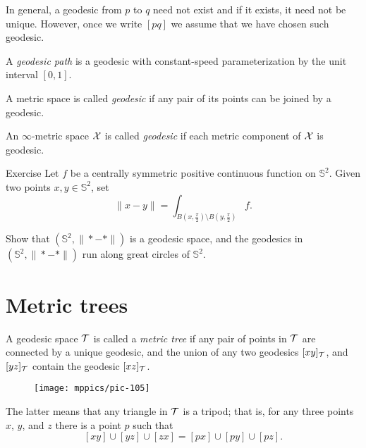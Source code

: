 In general, a geodesic from $p$ to $q$ need not exist and if it exists, it need not  be unique.  
However, once we write $[p q]$ we assume that we have chosen such geodesic.

A \emph{geodesic path} is a geodesic with constant-speed parameterization by the unit interval $[0,1]$.

A metric space is called \emph{geodesic} if any pair of its points can be joined by a geodesic.

An $\infty$-metric space $\mathcal{X}$ is called {}\emph{geodesic} if each metric component of $\mathcal{X}$ is geodesic.

\begin{thm}{Exercise}\label{ex:pogorelov}
Let $f$ be a centrally symmetric positive continuous function on $\mathbb{S}^2$.
Given two points $x,y\in \mathbb{S}^2$,
set 
\[\|x-y\|=\int_{B(x,\frac \pi2)\setminus B(y,\frac\pi2)}f.\]

Show that $(\mathbb{S}^2,\|{*}-{*}\|)$ is a geodesic space,
and the geodesics in $(\mathbb{S}^2,\|{*}-{*}\|)$ run along great circles of $\mathbb{S}^2$.
\end{thm}

\section{Metric trees}

A geodesic space $\mathcal{T}$ is called a \emph{metric tree} if any pair of points in $\mathcal{T}$ are connected by a unique geodesic,
and the union of any two geodesics $[xy]_{\mathcal{T}}$, and $[yz]_{\mathcal{T}}$ contain the geodesic $[xz]_{\mathcal{T}}$.

{

\begin{wrapfigure}{r}{25 mm}
\vskip-6mm
\centering
\texttt{[image: mppics/pic-105]}
\end{wrapfigure}

The latter means that any triangle in $\mathcal{T}$ is a tripod;
that is, for any three points $x$, $y$, and $z$ there is a point $p$ such that 
\[[xy]\cup[yz]\cup[zx]=[px]\cup[py]\cup[pz].\]

}

